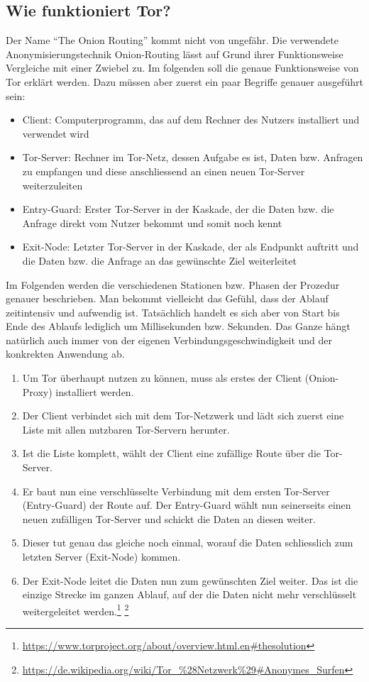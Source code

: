 \subsection{Wie funktioniert Tor?}
Der Name ``The Onion Routing'' kommt nicht von ungefähr. Die verwendete Anonymisierungstechnik Onion-Routing lässt auf Grund ihrer Funktionsweise Vergleiche mit einer Zwiebel zu. Im folgenden soll die genaue Funktionsweise von Tor erklärt werden. Dazu müssen aber zuerst ein paar Begriffe genauer ausgeführt sein:
\begin{itemize}
\item Client: Computerprogramm, das auf dem Rechner des Nutzers installiert und verwendet wird
\item Tor-Server: Rechner im Tor-Netz, dessen Aufgabe es ist, Daten bzw. Anfragen zu empfangen und diese anschliessend an einen neuen Tor-Server weiterzuleiten
\item Entry-Guard: Erster Tor-Server in der Kaskade, der die Daten bzw. die Anfrage direkt vom Nutzer bekommt und somit noch kennt
\item Exit-Node: Letzter Tor-Server in der Kaskade, der als Endpunkt auftritt und die Daten bzw. die Anfrage an das gewünschte Ziel weiterleitet
\end{itemize}

Im Folgenden werden die verschiedenen Stationen bzw. Phasen der Prozedur genauer beschrieben. Man bekommt vielleicht das Gefühl, dass der Ablauf zeitintensiv und aufwendig ist. Tatsächlich handelt es sich aber von Start bis Ende des Ablaufs lediglich um Millisekunden bzw. Sekunden. Das Ganze hängt natürlich auch immer von der eigenen Verbindungsgeschwindigkeit und der konkrekten Anwendung ab.

\begin{enumerate}
\item Um Tor überhaupt nutzen zu können, muss als erstes der  Client (Onion-Proxy) installiert werden.
\item Der Client verbindet sich mit dem Tor-Netzwerk und lädt sich zuerst eine Liste mit allen nutzbaren Tor-Servern herunter.
\item Ist die Liste komplett, wählt der Client eine zufällige Route über die Tor-Server.
\item Er baut nun eine verschlüsselte Verbindung mit dem ersten Tor-Server (Entry-Guard) der Route auf. Der Entry-Guard wählt nun seinerseits einen neuen zufälligen Tor-Server und schickt die Daten an diesen weiter.
\item Dieser tut genau das gleiche noch einmal, worauf die Daten schliesslich zum letzten Server (Exit-Node) kommen.
\item Der Exit-Node leitet die Daten nun zum gewünschten Ziel weiter. Das ist die einzige Strecke im ganzen Ablauf, auf der die Daten nicht mehr verschlüsselt weitergeleitet werden.\footnote{\url{https://www.torproject.org/about/overview.html.en\#thesolution}}
\footnote{\url{https://de.wikipedia.org/wiki/Tor_\%28Netzwerk\%29\#Anonymes_Surfen}}
\end{enumerate}

